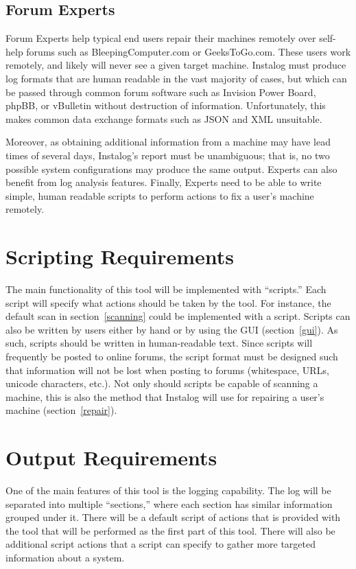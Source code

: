 \documentclass[letterpaper,12pt]{article}
\begin{document}
\subsection{Forum Experts}
Forum Experts help typical end users repair their machines remotely over
self-help forums such as BleepingComputer.com or GeeksToGo.com.
These users work remotely, and likely will never see a given target
machine.
Instalog must produce log formats that are human readable in the vast majority
of cases, but which can be passed through common forum software such as Invision
Power Board, phpBB, or vBulletin without destruction of information.
Unfortunately, this makes common data exchange formats such as JSON and XML
unsuitable. 

Moreover, as obtaining additional information from a machine may
have lead times of several days, Instalog's report must be unambiguous; that is,
no two possible system configurations may produce the same output. Experts can
also benefit from log analysis features. Finally, Experts need to be able to
write simple, human readable scripts to perform actions to fix a user's machine
remotely.

\newpage



\section{Scripting Requirements} \label{scripting}
The main functionality of this tool will be implemented with ``scripts.''  Each
script will specify what actions should be taken by the tool.  For instance, the
default scan in section~\ref{scanning} could be implemented with a script. 
Scripts can also be written by users either by hand or by using the GUI
(section~\ref{gui}).  As such, scripts should be written in human-readable text.
Since scripts will frequently be posted to online forums, the script format must
be designed such that information will not be lost when posting to forums
(whitespace, URLs, unicode characters, etc.).  Not only should scripts be
capable of scanning a machine, this is also the method that Instalog will use
for repairing a user's machine (section~\ref{repair}).

\newpage



\section{Output Requirements} \label{output}
One of the main features of this tool is the logging capability.  The log will
be separated into multiple ``sections,'' where each section has similar
information grouped under it.  There will be a default script of actions that is
provided with the tool that will be performed as the first part of this tool.   
There will also be additional script actions that a script can specify to gather
more targeted information about a system.
\end{document}

